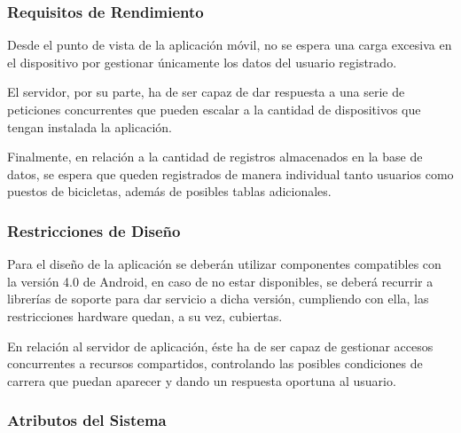 \subsubsection{Requisitos de Rendimiento}

Desde el punto de vista de la aplicación móvil, no se espera una carga excesiva en el dispositivo por gestionar únicamente los datos del usuario registrado.

El servidor, por su parte, ha de ser capaz de dar respuesta a una serie de peticiones concurrentes que pueden escalar a la cantidad de dispositivos que tengan instalada la aplicación.

Finalmente, en relación a la cantidad de registros almacenados en la base de datos, se espera que queden registrados de manera individual tanto usuarios como puestos de bicicletas, además de posibles tablas adicionales.

\subsubsection{Restricciones de Diseño}

Para el diseño de la aplicación se deberán utilizar componentes compatibles con la versión 4.0 de Android, en caso de no estar disponibles, se deberá recurrir a librerías de soporte para dar servicio a dicha versión, cumpliendo con ella, las restricciones hardware quedan, a su vez, cubiertas.

En relación al servidor de aplicación, éste ha de ser capaz de gestionar accesos concurrentes a recursos compartidos, controlando las posibles condiciones de carrera que puedan aparecer y dando un respuesta oportuna al usuario. 

\subsubsection{Atributos del Sistema}

